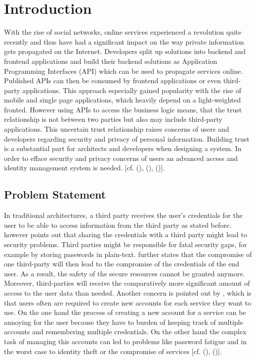 \chapter{Introduction}\label{chap:introduction}
\chapterstart

With the rise of social networks, online services experienced a revolution quite recently and thus have had a significant impact on the way private information gets propagated on the Internet. Developers split up solutions into backend and frontend applications and build their backend solutions as Application Programming Interfaces (API) which can be used to propagate services online. Published APIs can then be consumed by frontend applications or even third-party applications. This approach especially gained popularity with the rise of mobile and single page applications, which heavily depend on a light-weighted fronted. However using APIs to access the business logic means, that the trust relationship is not between two parties but also may include third-party applications. This uncertain trust relationship raises concerns of users and developers regarding security and privacy of personal information. Building trust is a substantial part for architects and developers when designing a system. In order to efface security and privacy concerns of users an advanced access and identity management system is needed. [cf. (\cite{Cirani:OBAS}), (\cite{Tkalec:2015}), (\cite{Rossvoll:2013:RUBIM})].


\section{Problem Statement}

In traditional architectures, a third party receives the user’s credentials for the user to be able to access information from the third party as stated before. \cite{Prasad:MMWPT} however points out that sharing the credentials with a third party might lead to security problems. Third parties might be responsible for fatal security gaps, for example by storing passwords in plain-text. \cite{Prasad:MMWPT} further states that the compromise of one third-party will then lead to the compromise of the credentials of the end user. As a result, the safety of the secure resources cannot be granted anymore. Moreover, third-parties will receive the comparatively more significant amount of access to the user data than needed. Another concern is pointed out by \cite{Sakimura:OIDCC}, which is that users often are required to create new accounts for each service they want to use. On the one hand the process of creating a new account for a service can be annoying for the user because they have to burden of keeping track of multiple accounts and remembering multiple credentials. On the other hand the complex task of managing this accounts can led to problems like password fatigue and in the worst case to identity theft or the compromise of services [cf. (\cite{Sakimura:OIDCC}), (\cite{Prasad:MMWPT})].

